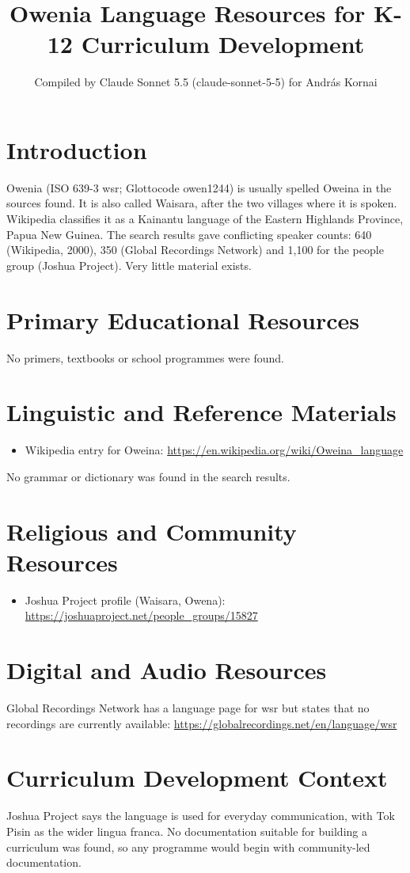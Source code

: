 \documentclass[12pt]{article}
\title{Owenia Language Resources for K-12 Curriculum Development}
\author{Compiled by Claude Sonnet 5.5 (claude-sonnet-5-5) for Andr\'as Kornai}
\date{}
\begin{document}
\maketitle

\section{Introduction}
Owenia (ISO 639-3 wsr; Glottocode owen1244) is usually spelled Oweina in the sources found. It is also called Waisara, after the two villages where it is spoken. Wikipedia classifies it as a Kainantu language of the Eastern Highlands Province, Papua New Guinea. The search results gave conflicting speaker counts: 640 (Wikipedia, 2000), 350 (Global Recordings Network) and 1,100 for the people group (Joshua Project). Very little material exists.

\section{Primary Educational Resources}
No primers, textbooks or school programmes were found.

\section{Linguistic and Reference Materials}
\begin{itemize}
\item Wikipedia entry for Oweina: \url{https://en.wikipedia.org/wiki/Oweina_language}
\end{itemize}
No grammar or dictionary was found in the search results.

\section{Religious and Community Resources}
\begin{itemize}
\item Joshua Project profile (Waisara, Owena): \url{https://joshuaproject.net/people_groups/15827}
\end{itemize}

\section{Digital and Audio Resources}
Global Recordings Network has a language page for wsr but states that no recordings are currently available: \url{https://globalrecordings.net/en/language/wsr}

\section{Curriculum Development Context}
Joshua Project says the language is used for everyday communication, with Tok Pisin as the wider lingua franca. No documentation suitable for building a curriculum was found, so any programme would begin with community-led documentation.
\end{document}
